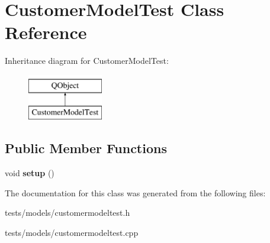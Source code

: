 \hypertarget{classCustomerModelTest}{}\section{Customer\+Model\+Test Class Reference}
\label{classCustomerModelTest}
Inheritance diagram for Customer\+Model\+Test\+:\begin{figure}[H]
\begin{center}
\leavevmode
\includegraphics[height=2.000000cm]{d5/dcd/classCustomerModelTest}
\end{center}
\end{figure}
\subsection*{Public Member Functions}
\begin{DoxyCompactItemize}
\item 
\hypertarget{classCustomerModelTest_a4909a05e6067adfa8e086bb61022d700}{}void {\bfseries setup} ()\label{classCustomerModelTest_a4909a05e6067adfa8e086bb61022d700}

\end{DoxyCompactItemize}


The documentation for this class was generated from the following files\+:\begin{DoxyCompactItemize}
\item 
tests/models/customermodeltest.\+h\item 
tests/models/customermodeltest.\+cpp\end{DoxyCompactItemize}
